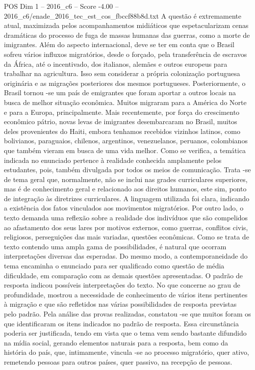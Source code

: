 \begin{textsample}{POS Dim 1 – 2016\_c6 – Score -4.00 – 2016\_c6/enade\_2016\_tec\_est\_cos\_fbccf88b8d.txt}
A questão é extremamente atual, maximizada pelos acompanhamentos midiáticos que espetacularizam cenas dramáticas do processo de fuga de massas humanas das guerras, como a morte de imigrantes.
Além do aspecto internacional, deve se ter em conta que o Brasil sofreu vários influxos migratórios, desde o forçado, pela transferência de escravos da África, até o incentivado, dos italianos, alemães e outros europeus para trabalhar na agricultura.
Isso sem considerar a própria colonização portuguesa originária e as migrações posteriores dos mesmos portugueses.
Posteriormente, o Brasil tornou -se um país de emigrantes que foram aportar a outros locais na busca de melhor situação econômica.
Muitos migraram para a América do Norte e para a Europa, principalmente.
Mais recentemente, por força do crescimento econômico pátrio, novas levas de imigrantes desembarcaram no Brasil, muitos deles provenientes do Haiti, embora tenhamos recebidos vizinhos latinos, como bolivianos, paraguaios, chilenos, argentinos, venezuelanos, peruanos, colombianos que também vieram em busca de uma vida melhor.
Como se verifica, a temática indicada no enunciado pertence à realidade conhecida amplamente pelos estudantes, pois, também divulgada por todos os meios de comunicação.
Trata -se de tema geral que, normalmente, não se inclui nas grades curriculares superiores, mas é de conhecimento geral e relacionado aos direitos humanos, este sim, ponto de integração às diretrizes curriculares.
A linguagem utilizada foi clara, indicando a existência dos fatos vinculados aos movimentos migratórios.
Por outro lado, o texto demanda uma reflexão sobre a realidade dos indivíduos que são compelidos ao afastamento dos seus lares por motivos externos, como guerras, conflitos civis, religiosos, perseguições das mais variadas, questões econômicas.
Como se trata de texto contendo uma ampla gama de possibilidades, é natural que ocorram interpretações diversas das esperadas.
Do mesmo modo, a contemporaneidade do tema encaminha o enunciado para ser qualificado como questão de média dificuldade, em comparação com as demais questões apresentadas.
O padrão de resposta indicou possíveis interpretações do texto.
No que concerne ao grau de profundidade, mostrou a necessidade de conhecimento de vários itens pertinentes à migração e que são refletidos nas várias possibilidades de resposta previstas pelo padrão.
Pela análise das provas realizadas, constatou -se que muitos foram os que identificaram os itens indicados no padrão de resposta.
Essa circunstância poderia ser justificada, tendo em vista que o tema vem sendo bastante difundido na mídia social, gerando elementos naturais para a resposta, bem como da história do país, que, intimamente, vincula -se ao processo migratório, quer ativo, remetendo pessoas para outros países, quer passivo, na recepção de pessoas.

\end{textsample}
